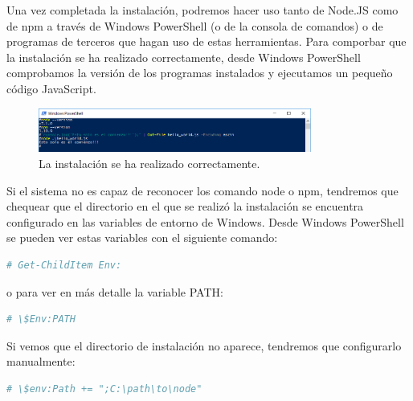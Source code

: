 Una vez completada la instalación, podremos hacer uso tanto de Node.JS como de npm a través de Windows PowerShell (o de la consola de comandos) o de programas de terceros que hagan uso de estas herramientas.
Para comporbar que la instalación se ha realizado correctamente, desde Windows PowerShell comprobamos la versión de los programas instalados y ejecutamos un pequeño código JavaScript.

\begin{figure}[H]
\centering
  \includegraphics[width=0.8\textwidth]{Figures/anexo/anexoI/nodejs/6}
  \caption{La instalación se ha realizado correctamente.}
\end{figure}

Si el sistema no es capaz de reconocer los comando node o npm, tendremos que chequear que el directorio en el que se realizó la instalación se encuentra configurado en las variables de entorno de Windows. Desde Windows PowerShell se pueden ver estas variables con el siguiente comando:

\begin{lstlisting}[language=bash]
  # Get-ChildItem Env:
\end{lstlisting}
o para ver en más detalle la variable PATH:
\begin{lstlisting}[language=bash]
  # \$Env:PATH
\end{lstlisting}

Si vemos que el directorio de instalación no aparece, tendremos que configurarlo manualmente:
\begin{lstlisting}[language=bash]
  # \$env:Path += ";C:\path\to\node"
\end{lstlisting}
